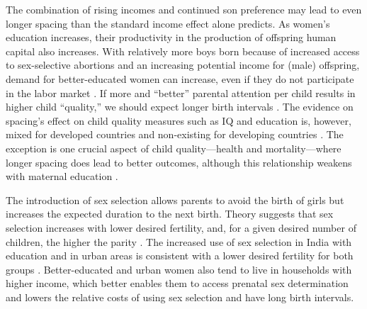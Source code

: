 \documentclass[12pt,letterpaper]{article}
\begin{document}
The combination of rising incomes and continued son preference may lead to even longer 
spacing than the standard income effect alone predicts.
As women's education increases, their productivity in the production of offspring human 
capital also increases.
With relatively more boys born because of increased access to sex-selective 
abortions and an increasing potential income for (male) offspring, demand for 
better-educated women can increase, even if they do not participate in the labor market 
\citep{Behrman1999}.
If more and ``better'' parental attention per child results in higher child ``quality,'' 
we should expect longer birth intervals 
\citep{Zajonc1975,Zajonc1976,Razin1980}.
The evidence on spacing's effect on child quality measures such as IQ 
and education is, however, mixed for developed countries and non-existing 
for developing countries
\citep{Powell1993,Pettersson-Lidbom2009,Buckles2012,Barclay2017}.
The exception is one crucial aspect of child quality---health and mortality---where
longer spacing does lead to better outcomes, although this relationship weakens with 
maternal education \citep{Whitworth2002,Conde-Agudelo2012,Molitoris2019}.


The introduction of sex selection allows parents to avoid the birth of girls
but increases the expected duration to the next birth.
Theory suggests that sex selection increases with lower desired fertility, and, for a 
given desired number of children, the higher the parity \citep{Portner2015b}.
The increased use of sex selection in India with education and in urban
areas is consistent with a lower desired fertility for both groups
\citep{das_gupta97,retherford03b,Guilmoto2009a,Portner2015b,Jayachandran2017}.
Better-educated and urban women also tend to live in households with higher income, which 
better enables them to access prenatal sex determination and lowers the relative costs of 
using sex selection and have long birth intervals.
\end{document}
